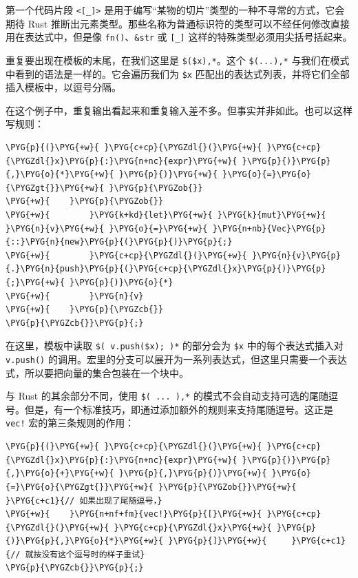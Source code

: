 第一个代码片段 \texttt{<[\_]>} 是用于编写“某物的切片”类型的一种不寻常的方式，它会期待 Rust 推断出元素类型。那些名称为普通标识符的类型可以不经任何修改直接用在表达式中，但是像 \texttt{fn()}、\texttt{\&str} 或 \texttt{[\_]} 这样的特殊类型必须用尖括号括起来。

重复要出现在模板的末尾，在我们这里是 \texttt{\$(\$x),*}。这个 \texttt{\$(...),*} 与我们在模式中看到的语法是一样的。它会遍历我们为 \texttt{\$x} 匹配出的表达式列表，并将它们全部插入模板中，以逗号分隔。

在这个例子中，重复输出看起来和重复输入差不多。但事实并非如此。也可以这样写规则：

\begin{Verbatim}[commandchars=\\\{\},breaklines=true,breakanywhere=true,fontsize=\codefont,xleftmargin=17bp]
\PYG{p}{(}\PYG{+w}{ }\PYG{c+cp}{\PYGZdl{}(}\PYG{+w}{ }\PYG{c+cp}{\PYGZdl{}x}\PYG{p}{:}\PYG{n+nc}{expr}\PYG{+w}{ }\PYG{p}{)}\PYG{p}{,}\PYG{o}{*}\PYG{+w}{ }\PYG{p}{)}\PYG{+w}{ }\PYG{o}{=}\PYG{o}{\PYGZgt{}}\PYG{+w}{ }\PYG{p}{\PYGZob{}}
\PYG{+w}{    }\PYG{p}{\PYGZob{}}
\PYG{+w}{        }\PYG{k+kd}{let}\PYG{+w}{ }\PYG{k}{mut}\PYG{+w}{ }\PYG{n}{v}\PYG{+w}{ }\PYG{o}{=}\PYG{+w}{ }\PYG{n+nb}{Vec}\PYG{p}{::}\PYG{n}{new}\PYG{p}{(}\PYG{p}{)}\PYG{p}{;}
\PYG{+w}{        }\PYG{c+cp}{\PYGZdl{}(}\PYG{+w}{ }\PYG{n}{v}\PYG{p}{.}\PYG{n}{push}\PYG{p}{(}\PYG{c+cp}{\PYGZdl{}x}\PYG{p}{)}\PYG{p}{;}\PYG{+w}{ }\PYG{p}{)}\PYG{o}{*}
\PYG{+w}{        }\PYG{n}{v}
\PYG{+w}{    }\PYG{p}{\PYGZcb{}}
\PYG{p}{\PYGZcb{}}\PYG{p}{;}
\end{Verbatim}

在这里，模板中读取 \texttt{\$( v.push(\$x); )*} 的部分会为 \texttt{\$x} 中的每个表达式插入对 \texttt{v.push()} 的调用。宏里的分支可以展开为一系列表达式，但这里只需要一个表达式，所以要把向量的集合包装在一个块中。

与 Rust 的其余部分不同，使用 \texttt{\$( ... ),*} 的模式不会自动支持可选的尾随逗号。但是，有一个标准技巧，即通过添加额外的规则来支持尾随逗号。这正是 \texttt{vec!} 宏的第三条规则的作用：

\begin{Verbatim}[commandchars=\\\{\},breaklines=true,breakanywhere=true,fontsize=\codefont,xleftmargin=17bp]
\PYG{p}{(}\PYG{+w}{ }\PYG{c+cp}{\PYGZdl{}(}\PYG{+w}{ }\PYG{c+cp}{\PYGZdl{}x}\PYG{p}{:}\PYG{n+nc}{expr}\PYG{+w}{ }\PYG{p}{)}\PYG{p}{,}\PYG{o}{+}\PYG{+w}{ }\PYG{p}{,}\PYG{p}{)}\PYG{+w}{ }\PYG{o}{=}\PYG{o}{\PYGZgt{}}\PYG{+w}{ }\PYG{p}{\PYGZob{}}\PYG{+w}{  }\PYG{c+c1}{// 如果出现了尾随逗号，}
\PYG{+w}{    }\PYG{n+nf+fm}{vec!}\PYG{p}{[}\PYG{+w}{ }\PYG{c+cp}{\PYGZdl{}(}\PYG{+w}{ }\PYG{c+cp}{\PYGZdl{}x}\PYG{+w}{ }\PYG{p}{)}\PYG{p}{,}\PYG{o}{*}\PYG{+w}{ }\PYG{p}{]}\PYG{+w}{     }\PYG{c+c1}{// 就按没有这个逗号时的样子重试}
\PYG{p}{\PYGZcb{}}\PYG{p}{;}
\end{Verbatim}

